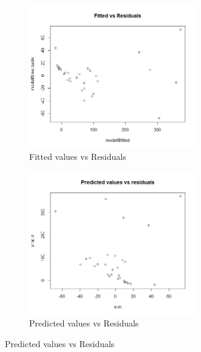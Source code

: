 \documentclass{article}
\begin{document}
\begin{figure}
 \centering
  \begin{subfigure}[b]{0.5\textwidth}
      \centering
        \includegraphics[width=0.8\textwidth]{Rplotf.png}
       \caption{Fitted values vs Residuals}
       \label{fig.1}
 \end{subfigure}
 \begin{subfigure}[b]{0.5\textwidth}
      \centering
      \includegraphics[width=0.8\textwidth]{Rplotp.png}
      \caption{Predicted values vs Residuals}
      \label{fig.2}
 \end{subfigure}

\end{figure}

\end{document}
